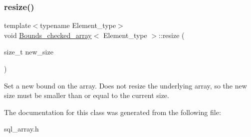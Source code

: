 \subsubsection{\texorpdfstring{resize()}{resize()}}
{\footnotesize\ttfamily template$<$typename Element\+\_\+type$>$ \\
void \mbox{\hyperlink{classBounds__checked__array}{Bounds\+\_\+checked\+\_\+array}}$<$ Element\+\_\+type $>$\+::resize (\begin{DoxyParamCaption}\item[{size\+\_\+t}]{new\+\_\+size }\end{DoxyParamCaption})\hspace{0.3cm}{\ttfamily [inline]}}

Set a new bound on the array. Does not resize the underlying array, so the new size must be smaller than or equal to the current size. 

The documentation for this class was generated from the following file\+:\begin{DoxyCompactItemize}
\item 
sql\+\_\+array.\+h\end{DoxyCompactItemize}
